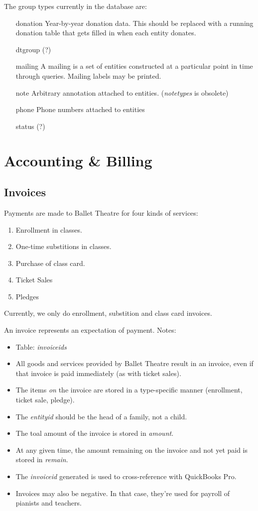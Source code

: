 \documentclass[11pt]{article}
\begin{document}
The group types currently in the database are:
 \begin{enumerate}
\item[donation] Year-by-year donation data.  This should be replaced with a running donation table that gets filled in when each entity donates.
 \item[dtgroup] (?)
 \item[mailing] A mailing is a set of entities constructed at a particular point in time through queries.  Mailing labels may be printed.
 \item[note] Arbitrary annotation attached to entities. (\emph{notetypes} is obsolete)
 \item[phone] Phone numbers attached to entities
 \item[status] (?)
 \end{enumerate}

\section{Accounting \& Billing}

\subsection{Invoices}

Payments are made to Ballet Theatre for four kinds of services:
 \begin{enumerate}
 \item Enrollment in classes.
 \item One-time substitions in classes.
 \item Purchase of class card.
 \item Ticket Sales
 \item Pledges
 \end{enumerate}
Currently, we only do enrollment, substition and class card invoices.

An invoice represents an expectation of payment.  Notes:
 \begin{itemize}
 \item Table: \emph{invoiceids}
 \item All goods and services provided by Ballet Theatre result in an invoice, even if that invoice is paid immediately (as with ticket sales).
 \item The items \emph{on} the invoice are stored in a type-specific manner (enrollment, ticket sale, pledge).
 \item The \emph{entityid} should be the head of a family, not a child.
 \item The toal amount of the invoice is stored in \emph{amount}.  
 \item At any given time, the amount remaining on the invoice and not yet paid is stored in \emph{remain}.
 \item The \emph{invoiceid} generated is used to cross-reference with QuickBooks Pro.
 \item Invoices may also be negative.  In that case, they're used for payroll of pianists and teachers.
 \end{itemize}
\end{document}
